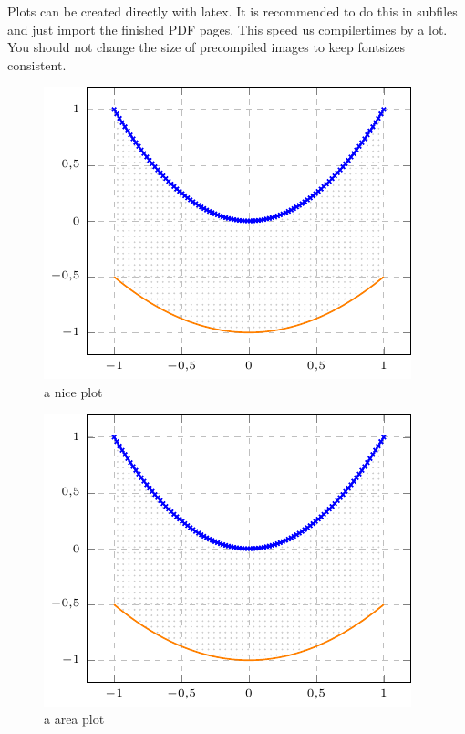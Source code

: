\documentclass[	%
		fontsize=11pt,  %
		a4paper,	    %
		english,		%
		sans,			%
		f1,				%
	]{HsH-report}		%
\begin{document}
		Plots can be created directly with latex. It is recommended to do this in subfiles and just import the finished PDF pages. This speed us
		compilertimes by a lot. You should not change the size of precompiled images to keep fontsizes consistent.
		\begin{figure}
			\includegraphics[page=2]{plt/examplePlot.pdf}
			\caption[centering]{a nice plot}
			\label{fig: plot1}
		\end{figure}
		\begin{figure}
			\includegraphics[page=1]{plt/examplePlot.pdf}
			\caption{a area plot}
			\label{fig: area}
		\end{figure}
\end{document}
